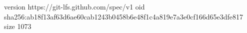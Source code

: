 version https://git-lfs.github.com/spec/v1
oid sha256:ab18f13af63d6ae60cab1243b0458b6e48f1c4a819e7a3e0cf166d65e3dfe817
size 1073
